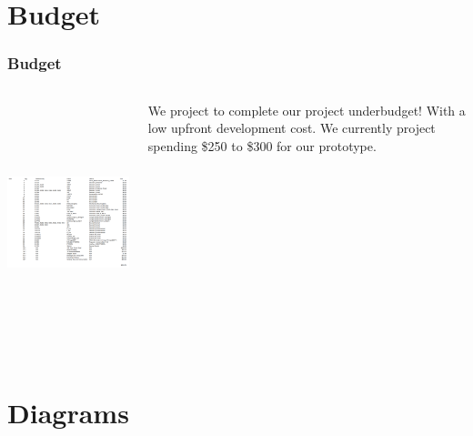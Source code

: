 \documentclass[aspectratio=169]{beamer}
\begin{document}
\section{Budget}
\begin{frame}
    \frametitle{Budget}

    \begin{columns}
        \begin{column}{0.70\textwidth}
            \includegraphics[height=7cm]{BOMTable}
        \end{column}

        \begin{column}{0.30\textwidth}
            We project to complete our project underbudget! With a low upfront development cost.
            We currently project spending \$250 to \$300 for our prototype.
        \end{column}
    \end{columns}


\end{frame}

\section{Diagrams}
\end{document}
